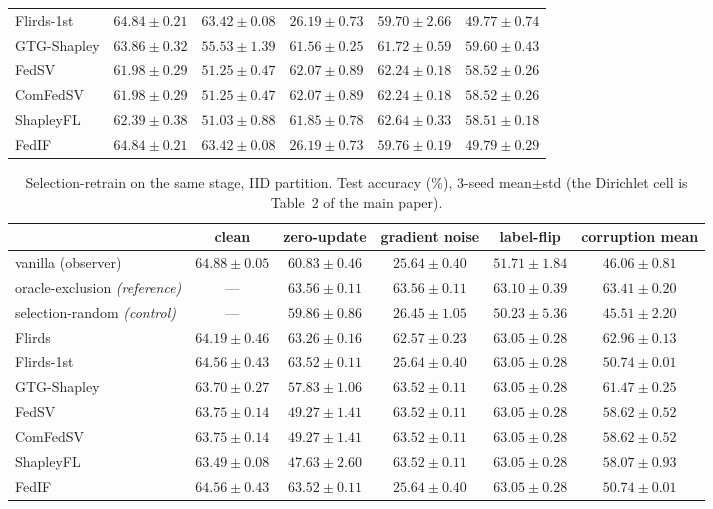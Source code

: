 \documentclass[letterpaper]{article} %
\theoremstyle{plain}
\begin{document}
\begin{table}[t]
\begin{tabular}{lccccc}
Flirds-1st & $64.84\pm0.21$ & $63.42\pm0.08$ & $26.19\pm0.73$ & $59.70\pm2.66$ & $49.77\pm0.74$ \\
GTG-Shapley & $63.86\pm0.32$ & $55.53\pm1.39$ & $61.56\pm0.25$ & $61.72\pm0.59$ & $59.60\pm0.43$ \\
FedSV & $61.98\pm0.29$ & $51.25\pm0.47$ & $62.07\pm0.89$ & $62.24\pm0.18$ & $58.52\pm0.26$ \\
ComFedSV & $61.98\pm0.29$ & $51.25\pm0.47$ & $62.07\pm0.89$ & $62.24\pm0.18$ & $58.52\pm0.26$ \\
ShapleyFL & $62.39\pm0.38$ & $51.03\pm0.88$ & $61.85\pm0.78$ & $62.64\pm0.33$ & $58.51\pm0.18$ \\
FedIF & $64.84\pm0.21$ & $63.42\pm0.08$ & $26.19\pm0.73$ & $59.76\pm0.19$ & $49.79\pm0.29$ \\
\hline
\end{tabular}
\end{table}

\begin{table}[t]
\centering
\small
\caption{Selection-retrain on the same stage, IID partition. Test accuracy
(\%), 3-seed mean$\pm$std (the Dirichlet cell is Table~2 of the main paper).}
\label{tab:iid-retrain}
\begin{tabular}{lccccc}
\hline
 & clean & zero-update & gradient noise & label-flip & corruption mean \\
\hline
vanilla (observer) & $64.88\pm0.05$ & $60.83\pm0.46$ & $25.64\pm0.40$ & $51.71\pm1.84$ & $46.06\pm0.81$ \\
oracle-exclusion \emph{(reference)} & --- & $63.56\pm0.11$ & $63.56\pm0.11$ & $63.10\pm0.39$ & $63.41\pm0.20$ \\
selection-random \emph{(control)} & --- & $59.86\pm0.86$ & $26.45\pm1.05$ & $50.23\pm5.36$ & $45.51\pm2.20$ \\
Flirds & $64.19\pm0.46$ & $63.26\pm0.16$ & $62.57\pm0.23$ & $63.05\pm0.28$ & $62.96\pm0.13$ \\
Flirds-1st & $64.56\pm0.43$ & $63.52\pm0.11$ & $25.64\pm0.40$ & $63.05\pm0.28$ & $50.74\pm0.01$ \\
GTG-Shapley & $63.70\pm0.27$ & $57.83\pm1.06$ & $63.52\pm0.11$ & $63.05\pm0.28$ & $61.47\pm0.25$ \\
FedSV & $63.75\pm0.14$ & $49.27\pm1.41$ & $63.52\pm0.11$ & $63.05\pm0.28$ & $58.62\pm0.52$ \\
ComFedSV & $63.75\pm0.14$ & $49.27\pm1.41$ & $63.52\pm0.11$ & $63.05\pm0.28$ & $58.62\pm0.52$ \\
ShapleyFL & $63.49\pm0.08$ & $47.63\pm2.60$ & $63.52\pm0.11$ & $63.05\pm0.28$ & $58.07\pm0.93$ \\
FedIF & $64.56\pm0.43$ & $63.52\pm0.11$ & $25.64\pm0.40$ & $63.05\pm0.28$ & $50.74\pm0.01$ \\
\hline
\end{tabular}
\end{table}
\end{document}
